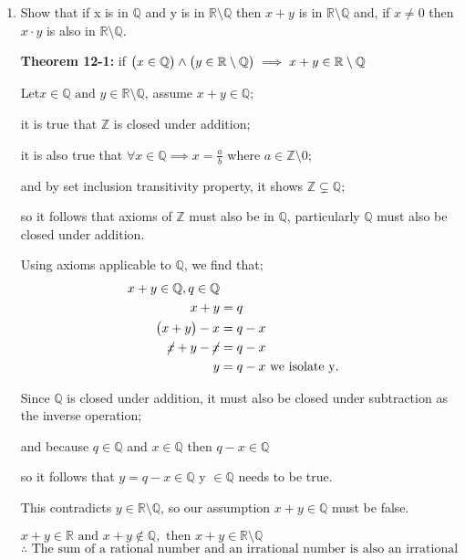 \documentclass{article}
\newcommand{\paren}[1]{\mathopen{}\left( {#1}_{{}_{}}\,\negthickspace\right)\mathclose{}} %
\begin{document}
\begin{enumerate}[start = 8, label = {\bfseries Problem \arabic*:}, leftmargin=1in]
    \item Show that if x is in \(\mathbb{Q}\) and y is in \(\mathbb{R \setminus Q}\) then \(x + y\) is in \(\mathbb{R 
    \setminus Q}\) and, if \(x \neq 0\) then \(x\cdot y\) is also in \(\mathbb{R \setminus Q}\). 

    \textbf{Theorem 12-1: } if \(\paren{x \in \mathbb{Q}} \land \paren{y \in \mathbb{R \setminus Q}} \implies x + y \in \mathbb{R \setminus Q}\)

    Let\(x \in \mathbb{Q} \text{ and } y \in \mathbb{R \setminus Q}\), assume \(x + y \in \mathbb{Q}\);

    it is true that \(\mathbb{Z}\) is closed under addition;
    
    it is also true that \(\forall x \in \mathbb{Q} \implies x = \frac{a}{b}\) where \(a \in \mathbb{Z} \setminus 0\);
    
    and by set inclusion transitivity property, it shows \(\mathbb{Z} \subsetneq \mathbb{Q}\);

    so it follows that axioms of \(\mathbb{Z}\) must also be in \(\mathbb{Q}\), particularly \(\mathbb{Q}\) must 
    also be closed under addition. 

    Using axioms applicable to \(\mathbb{Q}\), we find that;
    \begin{align*}
        x + y \in \mathbb{Q}, q \in \mathbb{Q} \\
        x + y &= q \\
        \paren{x + y} - x &= q - x \\
        \cancel{x} + y - \cancel{x} &= q - x \\
        y &= q - x \text{ we isolate y}.
    \end{align*}

    Since \(\mathbb{Q}\) is closed under addition, it must also be closed under subtraction as the inverse
    operation;
    
    and because \(q \in \mathbb{Q}\) and \(x \in \mathbb{Q}\) then \(q - x \in \mathbb{Q}\)

    so it follows that \(y = q - x \in \mathbb{Q}\) y \(\in \mathbb{Q}\) needs to be true.

    This contradicts \(y \in \mathbb{R \setminus Q}\), so our assumption \(x + y \in \mathbb{Q}\) must be false.

    \(x + y \in \mathbb{R} \text{ and } x + y \notin \mathbb{Q}, \text{ then } x + y \in \mathbb{R \setminus Q}\) 
    \[
        \therefore \text{ The sum of a rational number and an irrational number is also an irrational number}
    \]


\end{enumerate}
\end{document}
